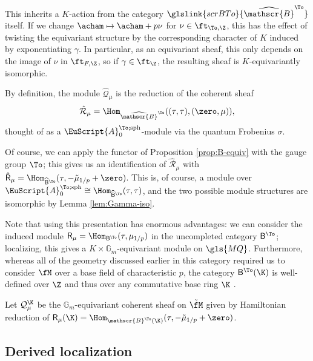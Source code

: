 This inherits a $K$-action from the category $\glslink{scrBTo}{\widehat{\mathscr{B}}^{\To}}$ itself.  If we change $\acham\mapsto \acham+p\nu$ for $\nu \in \ft_{\To,\Z}$, this has the effect of twisting the equivariant structure by the corresponding character of $K$ induced by exponentiating $\gamma$. In particular, as an equivariant sheaf, this only depends on the image of $\nu$ in $\ft_{F,\Z}$, so if $\gamma\in \ft_{\Z}$, the resulting sheaf is $K$-equivariantly isomorphic.

By definition, the module $\mathcal{\hat Q}_\mu$ is the reduction of the coherent sheaf \[\mathcal{\hat R}_\mu=\Hom_{\widehat{\mathscr{B}}^{\To}}( (\tau,\tau),(\zero,\mu)),\] thought of as a $\EuScript{A}^{\To;\operatorname{sph}}_0$-module via the quantum Frobenius $\sigma$.  

Of course, we can apply the functor of Proposition \ref{prop:B-equiv} with the gauge group $\To$;  this gives us an identification of $\mathcal{\hat R}_\mu$ with $\mathsf{\hat R}_\mu=\Hom_{\widehat{\mathsf{B}}^{\To}}( \tau,-\tilde{\mu}_{1/p}+\zero)$.  This is, of course, a module over $\EuScript{A}^{\To;\operatorname{sph}}_0\cong \Hom_{\widehat{\mathsf{B}}^{\To}}( \tau,\tau)$, and the two possible module structures are isomorphic  by Lemma \ref{lem:Gamma-iso}.

Note that using this presentation has enormous advantages: we can consider the induced module $\mathsf{ R}_\mu=\Hom_{{\mathsf{B}}^{\To}}( \tau,\mu_{1/p})$ in the uncompleted category ${\mathsf{B}}^{\To}$; localizing, this gives a $K\times \mathbb{G}_m$-equivariant module on $\gls{MQ}$. Furthermore, whereas all of the geometry discussed earlier in this category required us to consider $\fM$ over a base field of  characteristic $p$, the category $ {\mathsf{B}}^{\To}(\K)$ is well-defined over $\Z$ and thus over any commutative base ring $\K$ .  
\begin{definition}
Let $\mathcal{Q}_\mu^{\K}$ be the $\mathbb{G}_m$-equivariant coherent sheaf on $\tilde{\fM}$ given by Hamiltonian reduction of $ \mathsf{ R}_\mu(\K)=\Hom_{{\mathscr{B}}^{\To}(\K)}( \tau,-\tilde{\mu}_{1/p}+\zero)$.
\end{definition}





\subsection{Derived localization}

